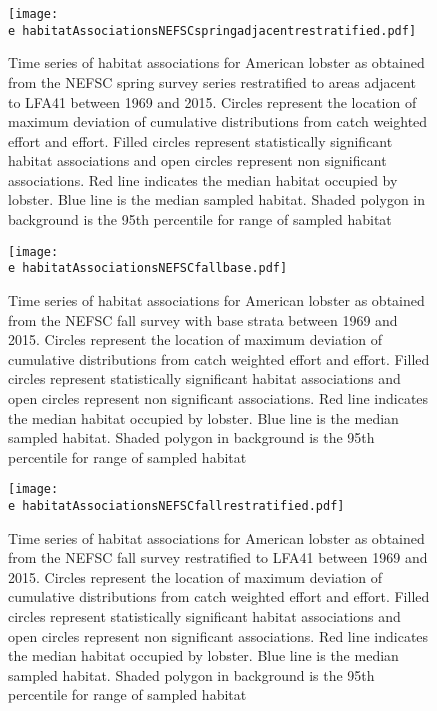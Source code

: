 \documentclass[11pt]{article}
\newcommand{\e}{/backup/bio_data/bio.lobster/figures/} %
\begin{document}
\begin{figure}

    \texttt{[image: \\e habitatAssociationsNEFSCspringadjacentrestratified.pdf]}
    \caption{Time series of habitat associations for American lobster as obtained from the NEFSC spring survey series restratified to areas adjacent to LFA41 between 1969 and 2015. Circles represent the location of maximum deviation of cumulative distributions from catch weighted effort and effort. Filled circles represent statistically significant habitat associations and open circles represent non significant associations. Red line indicates
the median habitat occupied by lobster. Blue line is the median sampled habitat. Shaded polygon in background is the 95th percentile for range of sampled habitat}

\end{figure}




\begin{figure}

    \texttt{[image: \\e habitatAssociationsNEFSCfallbase.pdf]}
    \caption{Time series of habitat associations for American lobster as obtained from the NEFSC fall survey with base strata between 1969 and 2015. Circles represent the location of maximum deviation of cumulative distributions from catch weighted effort and effort. Filled circles represent statistically significant habitat associations and open circles represent non significant associations. Red line indicates
the median habitat occupied by lobster. Blue line is the median sampled habitat. Shaded polygon in background is the 95th percentile for range of sampled habitat}

\end{figure}



\begin{figure}

    \texttt{[image: \\e habitatAssociationsNEFSCfallrestratified.pdf]}
    \caption{Time series of habitat associations for American lobster as obtained from the NEFSC fall survey restratified to LFA41 between 1969 and 2015. Circles represent the location of maximum deviation of cumulative distributions from catch weighted effort and effort. Filled circles represent statistically significant habitat associations and open circles represent non significant associations. Red line indicates
the median habitat occupied by lobster. Blue line is the median sampled habitat. Shaded polygon in background is the 95th percentile for range of sampled habitat}

\end{figure}
\end{document}
